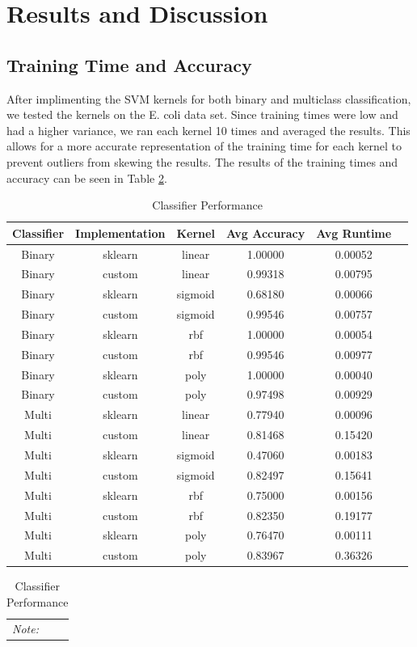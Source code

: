 \documentclass[12pt]{article}
\begin{document}
\section{Results and Discussion}
\subsection{Training Time and Accuracy}
After implimenting the SVM kernels for both binary and multiclass classification, we tested the kernels on the E. coli data set.
Since training times were low and had a higher variance, we ran each kernel 10 times and averaged the results.
This allows for a more accurate representation of the training time for each kernel to prevent outliers from skewing the results.
The results of the training times and accuracy can be seen in Table \ref{tab:classifier_performance}.
\begin{table}[h]
    \centering
    \caption{Classifier Performance}
    \label{tab:classifier_performance}
    \begin{tabular}{cccccc}
        \toprule
        \textbf{Classifier} & \textbf{Implementation} & \textbf{Kernel} & \textbf{Avg Accuracy} & \textbf{Avg Runtime} \\
        \midrule
        Binary & sklearn & linear & 1.00000 & 0.00052 \\
        Binary & custom & linear & 0.99318 & 0.00795 \\
        Binary & sklearn & sigmoid & 0.68180 & 0.00066 \\
        Binary & custom & sigmoid & 0.99546 & 0.00757 \\
        Binary & sklearn & rbf & 1.00000 & 0.00054 \\
        Binary & custom & rbf & 0.99546 & 0.00977 \\
        Binary & sklearn & poly & 1.00000 & 0.00040 \\
        Binary & custom & poly & 0.97498 & 0.00929 \\
        Multi & sklearn & linear & 0.77940 & 0.00096 \\
        Multi & custom & linear & 0.81468 & 0.15420 \\
        Multi & sklearn & sigmoid & 0.47060 & 0.00183 \\
        Multi & custom & sigmoid & 0.82497 & 0.15641 \\
        Multi & sklearn & rbf & 0.75000 & 0.00156 \\
        Multi & custom & rbf & 0.82350 & 0.19177 \\
        Multi & sklearn & poly & 0.76470 & 0.00111 \\
        Multi & custom & poly & 0.83967 & 0.36326 \\
        \bottomrule
    \end{tabular}
    \vspace{1em}  %
    \begin{tabular}{p{}}  %
        \multicolumn{1}{l}{\textit{Note:}} These times were calculated with 10 runs for each kernel and averaged. \\
    \end{tabular}
\end{table}
\end{document}
